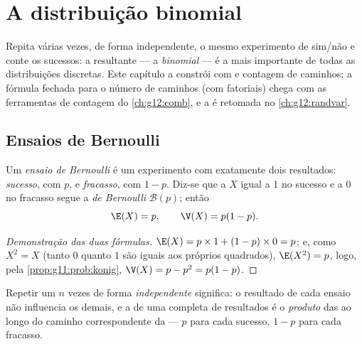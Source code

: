 \chapter{A distribuição binomial}\label{ch:g11:binom}

Repita várias vezes, de forma independente, o mesmo experimento de
sim/não e conte os sucessos: a  resultante --- a
\emph{binomial} --- é a mais importante de todas as distribuições
discretas. Este capítulo a constrói com  e contagem de caminhos; a
fórmula fechada para o número de caminhos (com fatoriais) chega com as
ferramentas de contagem do \cref{ch:g12:comb}, e a  é
retomada no \cref{ch:g12:randvar}.

\section{Ensaios de Bernoulli}

\begin{definition}\label{def:g11:binom:bernoulli}
Um \emph{ensaio de Bernoulli} é um experimento
com exatamente dois resultados: \emph{sucesso}, com  $p$, e
\emph{fracasso}, com  $1 - p$. Diz-se que a  $X$ igual a $1$ no sucesso e a $0$ no fracasso segue a
\emph{ de Bernoulli} $\mathcal B(p)$; então
\[
\E(X) = p,
\qquad
\V(X) = p(1 - p).
\]
\end{definition}

\begin{proof}[Demonstração das duas fórmulas]
$\E(X) = p \times 1 + (1-p) \times 0 = p$; e, como $X^2 = X$ (tanto $0$
quanto $1$ são iguais aos próprios quadrados), $\E(X^2) = p$, logo, pela
\cref{prop:g11:prob:konig}, $\V(X) = p - p^2 = p(1-p)$.
\end{proof}

\begin{definition}\label{def:g11:binom:repeated}
Repetir um  $n$ vezes de forma \emph{independente}
significa: o resultado de cada ensaio não influencia os demais, e a
 de uma  completa de resultados é o \emph{produto}
das  ao longo do caminho correspondente da  --- $p$
para cada sucesso, $1 - p$ para cada fracasso.
\end{definition}


